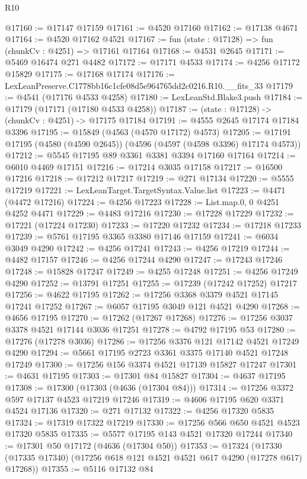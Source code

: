 \begin{lexlean}{R10}
\begin{coremodule}
@17160 := @17147 @17159
@17161 := @4520 @17160
@17162 := @17138 @4671
@17164 := @4520 @17162 @4521
@17167 := fun (state : @17128) => fun (chunkCv : @4251) => @17161 @17164
@17168 := @4531 @2645
@17171 := @5469 @16474 @271 @4482
@17172 := @17171 @4533
@17174 := @4256 @17172 @15829
@17175 := @17168 @17174
@17176 := LexLeanPreserve.C1778bb16c1cfe08d5e964765dd2c0216.R10.__fits_33
@17179 := @4541 (@17176 @4533 @4258)
@17180 := LexLeanStd.Blake3.push
@17184 := @17179 (@17171 (@17180 @4533 @4258))
@17187 := (state : @17128) -> (chunkCv : @4251) -> @17175 @17184
@17191 := @4555 @2645 @17174 @17184 @3396
@17195 := @15849 (@4563 (@4570 @17172) @4573)
@17205 := @17191 @17195 (@4580 (@4590 @2645)) (@4596 (@4597 (@4598 @3396) @17174 @4573))
@17212 := @5545 @17195 @89 @3361 @3381 @3394 @17160 @17164
@17214 := @6010 @4469 @17151
@17216 := @17214 @3035 @17158
@17217 := @16500 @17216
@17218 := @17212 @17217
@17219 := @271 @17134
@17220 := @5555 @17219
@17221 := LexLeanTarget.TargetSyntax.Value.list
@17223 := @4471 (@4472 @17216)
@17224 := @4256 @17223
@17228 := List.map.{0, 0} @4251 @4252 @4471
@17229 := @4483 @17216
@17230 := @17228 @17229
@17232 := @17221 (@17224 @17230)
@17233 := @17220 @17232
@17234 := @17218 @17233
@17239 := @5761 @17195 @3365 @3380 @17146 @17159
@17241 := @6034 @3049 @4290
@17242 := @4256 @17241
@17243 := @4256 @17219
@17244 := @4482 @17157
@17246 := @4256 @17244 @4290
@17247 := @17243 @17246
@17248 := @15828 @17247
@17249 := @4255 @17248
@17251 := @4256 @17249 @4290
@17252 := @13791 @17251
@17255 := @17239 (@17242 @17252) @17217
@17256 := @4622 @17195
@17262 := @17256 @3368 @3379 @4521 @17145 @17241 @17252
@17267 := @6057 @17195 @3049 @121 @4521 @4290
@17268 := @4656 @17195
@17270 := @17262 (@17267 @17268)
@17276 := @17256 @3037 @3378 @4521 @17144 @3036 @17251
@17278 := @4792 @17195 @53
@17280 := @17276 (@17278 @3036)
@17286 := @17256 @3376 @121 @17142 @4521 @17249 @4290
@17294 := @5661 @17195 @2723 @3361 @3375 @17140 @4521 @17248 @17249
@17300 := @17256 @156 @3374 @4521 @17139 @15827 @17247
@17301 := @4631 @17195
@17303 := @17301 @84 @15827
@17304 := @4637 @17195
@17308 := @17300 (@17303 (@4636 (@17304 @84)))
@17314 := @17256 @3372 @597 @17137 @4523 @17219 @17246
@17319 := @4606 @17195 @620 @3371 @4524 @17136
@17320 := @271 @17132
@17322 := @4256 @17320 @5835
@17324 := @17319 @17322 @17219
@17330 := @17256 @566 @650 @4521 @4523 @17320 @5835
@17335 := @5577 @17195 @143 @4521 @17320 @17244
@17340 := @17301 @50 @17172 (@4636 (@17304 @50))
@17353 := @17324
    (@17330 (@17335 @17340) (@17256 @618 @121 @4521 @4521 @617 @4290 (@17278 @617) @17268))
@17355 := @5116 @17132 @84

\end{coremodule}
\end{lexlean}
